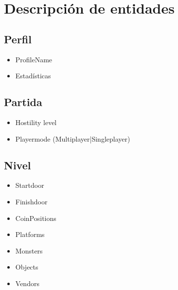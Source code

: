 \section{Descripción de entidades}


\subsection{Perfil}
\begin{itemize}
    \item ProfileName
    \item Estadísticas 
\end{itemize}

\subsection{Partida}
\begin{itemize}
    \item Hostility level
    \item Playermode (Multiplayer|Singleplayer)
\end{itemize}

\subsection{Nivel}
\begin{itemize}
    \item Startdoor
    \item Finishdoor
    \item CoinPositions
    \item Platforms
    \item Monsters
    \item Objects
    \item Vendors
\end{itemize}

